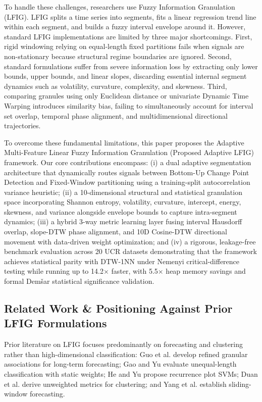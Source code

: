 \documentclass[conference]{IEEEtran}
\begin{document}
To handle these challenges, researchers use Fuzzy Information Granulation (LFIG). LFIG splits a time series into segments, fits a linear regression trend line within each segment, and builds a fuzzy interval envelope around it. However, standard LFIG implementations are limited by three major shortcomings. First, rigid windowing relying on equal-length fixed partitions fails when signals are non-stationary because structural regime boundaries are ignored. Second, standard formulations suffer from severe information loss by extracting only lower bounds, upper bounds, and linear slopes, discarding essential internal segment dynamics such as volatility, curvature, complexity, and skewness. Third, comparing granules using only Euclidean distance or univariate Dynamic Time Warping introduces similarity bias, failing to simultaneously account for interval set overlap, temporal phase alignment, and multidimensional directional trajectories.

To overcome these fundamental limitations, this paper proposes the Adaptive Multi-Feature Linear Fuzzy Information Granulation (Proposed Adaptive LFIG) framework. Our core contributions encompass: (i) a dual adaptive segmentation architecture that dynamically routes signals between Bottom-Up Change Point Detection and Fixed-Window partitioning using a training-split autocorrelation variance heuristic; (ii) a 10-dimensional structural and statistical granulation space incorporating Shannon entropy, volatility, curvature, intercept, energy, skewness, and variance alongside envelope bounds to capture intra-segment dynamics; (iii) a hybrid 3-way metric learning layer fusing interval Hausdorff overlap, slope-DTW phase alignment, and 10D Cosine-DTW directional movement with data-driven weight optimization; and (iv) a rigorous, leakage-free benchmark evaluation across 20 UCR datasets demonstrating that the framework achieves statistical parity with DTW-1NN under Nemenyi critical-difference testing while running up to 14.2$\times$ faster, with 5.5$\times$ heap memory savings and formal Dem\v{s}ar statistical significance validation.

\subsection{Related Work \& Positioning Against Prior LFIG Formulations}
Prior literature on LFIG focuses predominantly on forecasting and clustering rather than high-dimensional classification: Guo et al. \cite{guo2025} develop refined granular associations for long-term forecasting; Gao and Yu \cite{gao2019} evaluate unequal-length classification with static weights; He and Yu \cite{he2023} propose recurrence plot SVMs; Duan et al. \cite{duan2018} derive unweighted metrics for clustering; and Yang et al. \cite{yang2017} establish sliding-window forecasting.
\end{document}
